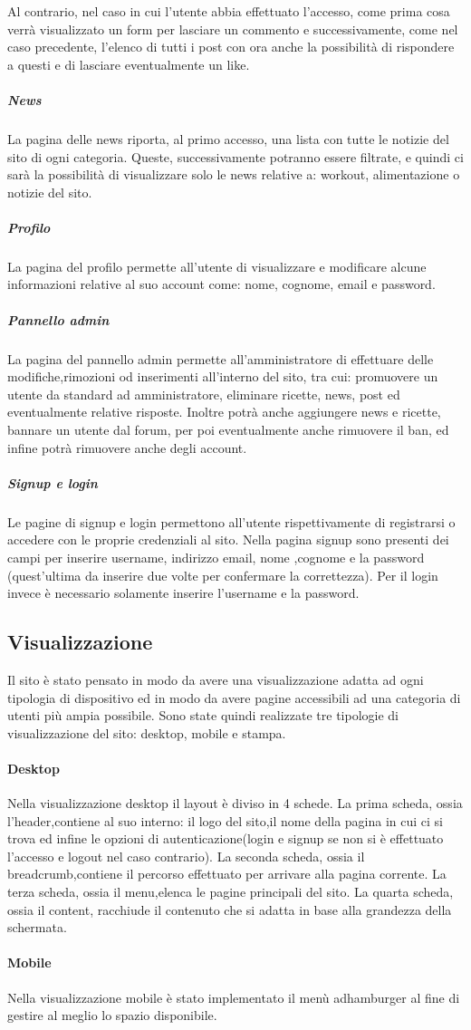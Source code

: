 Al contrario, nel caso in cui l'utente abbia effettuato l'accesso, come prima cosa verrà visualizzato un form per lasciare un commento e successivamente, come nel caso precedente, l'elenco di tutti i post con ora anche la possibilità di rispondere a questi e di lasciare eventualmente un like.
\subparagraph{News}
La pagina delle news riporta, al primo accesso, una lista con tutte le notizie del sito di ogni categoria. Queste, successivamente potranno essere filtrate, e quindi ci sarà la possibilità di visualizzare solo le news relative a: workout, alimentazione o notizie del sito.
\subparagraph{Profilo}
La pagina del profilo permette all'utente di visualizzare e modificare alcune informazioni relative al suo account come: nome, cognome, email e password.
\subparagraph{Pannello admin}
La pagina del pannello admin permette all'amministratore di effettuare delle modifiche,rimozioni od inserimenti all'interno del sito, tra cui: promuovere un utente da standard ad amministratore, eliminare ricette, news, post ed eventualmente relative risposte.
Inoltre potrà anche aggiungere news e ricette, bannare un utente dal forum, per poi eventualmente anche rimuovere il ban, ed infine potrà rimuovere anche degli account.
\subparagraph{Signup e login}
Le pagine di signup e login permettono all'utente rispettivamente di  registrarsi o accedere con le proprie credenziali al sito. Nella pagina signup sono presenti dei campi per inserire username, indirizzo email, nome ,cognome e la password (quest’ultima da inserire due volte per confermare la correttezza). Per il login invece è necessario solamente inserire l'username e la password.
\subsection{Visualizzazione}
Il sito è stato pensato in modo da avere una visualizzazione adatta ad ogni tipologia di dispositivo ed in modo da avere pagine accessibili ad una categoria di utenti più ampia possibile.
Sono state quindi realizzate tre tipologie di visualizzazione del sito: desktop, mobile e stampa.
\paragraph{Desktop}
Nella visualizzazione desktop il layout è diviso in 4 schede.
La prima scheda, ossia l'header,contiene al suo interno: il logo del sito,il nome della pagina in cui ci si trova ed infine le opzioni di autenticazione(login e signup se non si è effettuato l'accesso e logout nel caso contrario).
La seconda scheda, ossia il breadcrumb,contiene il percorso effettuato per arrivare alla pagina corrente.
La terza scheda, ossia il menu,elenca le pagine principali del sito.
La quarta scheda, ossia il content, racchiude il contenuto che si adatta in base alla grandezza della schermata.
\paragraph{Mobile}
Nella visualizzazione mobile è stato implementato il menù adhamburger al fine di gestire al meglio lo spazio disponibile.



  
       